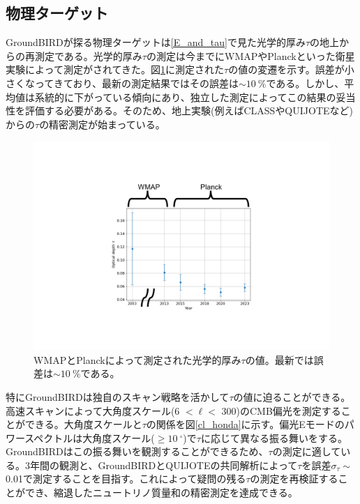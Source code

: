 \subsection{物理ターゲット}
GroundBIRDが探る物理ターゲットは\ref{E_and_tau}で見た光学的厚み$\tau$の地上からの再測定である。光学的厚み$\tau$の測定は今までにWMAPやPlanckといった衛星実験によって測定がされてきた。図\ref{tau_planck}に測定された$\tau$の値の変遷を示す。誤差が小さくなってきており、最新の測定結果ではその誤差は$\sim\SI{10}{\%}$である。しかし、平均値は系統的に下がっている傾向にあり、独立した測定によってこの結果の妥当性を評価する必要がある。そのため、地上実験(例えばCLASS\cite{CLASS}やQUIJOTE\cite{QUIJOTE}など)からの$\tau$の精密測定が始まっている。

\begin{figure}[htbp]
  \centering
  \includegraphics[width=0.8\columnwidth]{3_GB/figs/tau_planck_wmap_cut.pdf}
  \caption{WMAPとPlanckによって測定された光学的厚み$\tau$の値\cite{tau_measure}。最新では誤差は$\sim\SI{10}{\%}$である。}
  \label{tau_planck}
\end{figure}

特にGroundBIRDは独自のスキャン戦略を活かして$\tau$の値に迫ることができる。高速スキャンによって大角度スケール(6 $<\ell<$ 300)のCMB偏光を測定することができる。大角度スケールと$\tau$の関係を図\ref{cl_honda}に示す。偏光Eモードのパワースペクトルは大角度スケール($\geq\SI{10}{^{\circ}}$)で$\tau$に応じて異なる振る舞いをする。GroundBIRDはこの振る舞いを観測することができるため、$\tau$の測定に適している。3年間の観測と、GroundBIRDとQUIJOTEの共同解析によって$\tau$を誤差$\sigma_{\tau}\sim$ 0.01で測定することを目指す\cite{joint_ana}。これによって疑問の残る$\tau$の測定を再検証することができ、縮退したニュートリノ質量和の精密測定を達成できる。

